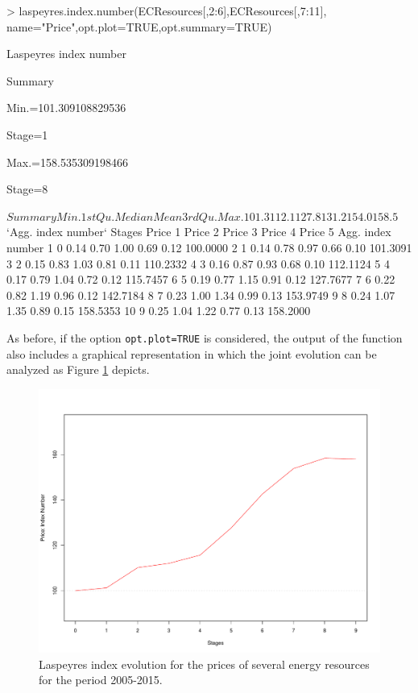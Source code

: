 \begin{example}
> laspeyres.index.number(ECResources[,2:6],ECResources[,7:11],
                         name="Price",opt.plot=TRUE,opt.summary=TRUE)

Laspeyres index number

Summary

Min.=101.309108829536

Stage=1

Max.=158.535309198466

Stage=8

$Summary
 Min. 1st Qu.  Median    Mean 3rd Qu.    Max. 
101.3   112.1   127.8   131.2   154.0   158.5 

$`Agg. index number`
Stages Price 1 Price 2 Price 3 Price 4 Price 5 Agg. index number
1       0    0.14    0.70    1.00    0.69    0.12          100.0000
2       1    0.14    0.78    0.97    0.66    0.10          101.3091
3       2    0.15    0.83    1.03    0.81    0.11          110.2332
4       3    0.16    0.87    0.93    0.68    0.10          112.1124
5       4    0.17    0.79    1.04    0.72    0.12          115.7457
6       5    0.19    0.77    1.15    0.91    0.12          127.7677
7       6    0.22    0.82    1.19    0.96    0.12          142.7184
8       7    0.23    1.00    1.34    0.99    0.13          153.9749
9       8    0.24    1.07    1.35    0.89    0.15          158.5353
10      9    0.25    1.04    1.22    0.77    0.13          158.2000
\end{example}

As before, if the option \verb|opt.plot=TRUE| is considered, the output of the function also includes a graphical representation in which the joint evolution can be analyzed as Figure \ref{laspeyres} depicts.

\begin{figure}[htbp]
	\centering
	\includegraphics[scale=0.4]{laspeyres_new.pdf}
	\caption{Laspeyres index evolution for the prices of several energy resources for the period 2005-2015.}
	\label{laspeyres}
\end{figure}


